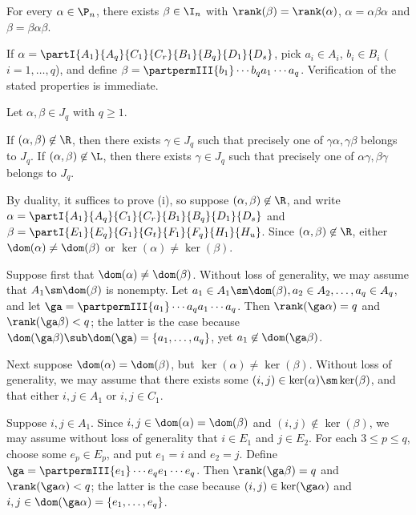 \begin{lemma}
\label{lemma-aa1}
For every $\alpha\in\P_n$, there exists $\beta\in\I_n$ with $\rank(\beta)=\rank(\alpha)$, $\alpha=\alpha\beta\alpha$ and $\beta=\beta\alpha\beta$.
\end{lemma}


\pf
If $\alpha=\partI{A_1}{A_q}{C_1}{C_r}{B_1}{B_q}{D_1}{D_s}$, pick $a_i\in A_i$, $b_i\in B_i$ ($i=1,\ldots,q$), and define $\beta=\partpermIII{b_1}\cdots{b_q}{a_1}\cdots{a_q}$. Verification of the stated properties is immediate.
\epf

\newpage

\begin{lemma}
\label{lemma-aa1b}
Let $\alpha,\beta\in J_q$ with $q\geq1$.  
\begin{itemize}
 If $(\alpha,\beta)\not\in{\R}$, then there exists $\gamma\in J_q$ such that precisely one of $\gamma\alpha,\gamma\beta$ belongs to $J_q$.
 If $(\alpha,\beta)\not\in{\L}$, then there exists $\gamma\in J_q$  such that precisely one of $\alpha\gamma,\beta\gamma$ belongs to $J_q$.
\end{itemize}
\end{lemma}

\pf  By duality, it suffices to prove (i), so suppose $(\alpha,\beta)\not\in{\R}$, and write $\alpha=\partI{A_1}{A_q}{C_1}{C_r}{B_1}{B_q}{D_1}{D_s}$ and $\beta=\partI{E_1}{E_q}{G_1}{G_t}{F_1}{F_q}{H_1}{H_u}$.
Since $(\alpha,\beta)\not\in{\R}$, either $\dom(\alpha)\neq\dom(\beta)$ or $\ker(\alpha)\neq\ker(\beta)$. 

\bigskip{}  Suppose first that $\dom(\alpha)\neq\dom(\beta)$.  Without loss of generality, we may assume that $A_1\sm\dom(\beta)$ is nonempty.  
Let $a_1\in A_1\sm\dom(\beta),a_2\in A_2,\ldots,a_q\in A_q$, and let $\ga=\partpermIII{a_1}\cdots{a_q}{a_1}\cdots{a_q}$.
Then $\rank(\ga\alpha)=q$ and $\rank(\ga\beta)<q$; the latter is the case because $\dom(\ga\beta)\sub\dom(\ga)=\{a_1,\ldots,a_q\}$, yet $a_1\not\in\dom(\ga\beta)$.  

\bigskip{} Next suppose $\dom(\alpha)=\dom(\beta)$, but $\ker(\alpha)\neq\ker(\beta)$.  Without loss of generality, we may assume that there exists some $(i,j)\in\ker(\alpha)\sm\ker(\beta)$, and that either $i,j\in A_1$ or $i,j\in C_1$.  

\bigskip{}  Suppose $i,j\in A_1$.  Since $i,j\in\dom(\alpha)=\dom(\beta)$ and $(i,j)\not\in\ker(\beta)$, we may assume without loss of generality that $i\in E_1$ and $j\in E_2$.  For each $3\leq p\leq q$, choose some $e_p\in E_p$, and put $e_1=i$ and $e_2=j$.  Define $\ga=\partpermIII{e_1}\cdots{e_q}{e_1}\cdots{e_q}$.
Then $\rank(\ga\beta)=q$ and $\rank(\ga\alpha)<q$; the latter is the case because $(i,j)\in\ker(\ga\alpha)$ and $i,j\in\dom(\ga\alpha)=\{e_1,\ldots,e_q\}$.  

